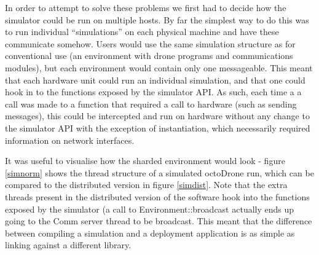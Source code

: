 In order to attempt to solve these problems we first had to decide how the simulator could be run on multiple hosts. By far the simplest way to do this was to run individual ``simulations'' on each physical machine and have these communicate somehow. Users would use the same simulation structure as for conventional use (an environment with drone programs and communications modules), but each environment would contain only one messageable. This meant that each hardware unit could run an individual simulation, and that one could hook in to the functions exposed by the simulator API. As such, each time a a call was made to a function that required a call to hardware (such as sending messages), this could be intercepted and run on hardware without any change to the simulator API with the exception of instantiation, which necessarily required information on network interfaces. 

It was useful to visualise how the sharded environment would look - figure \ref{simnorm} shows the thread structure of a simulated octoDrone run, which can be compared to the distributed version in figure \ref{simdist}. Note that the extra threads present in the distributed version of the software hook into the functions exposed by the simulator (a call to Environment::broadcast actually ends up going to the Comm server thread to be broadcast. This meant that the difference between compiling a simulation and a deployment application is as simple as linking against a different library.

